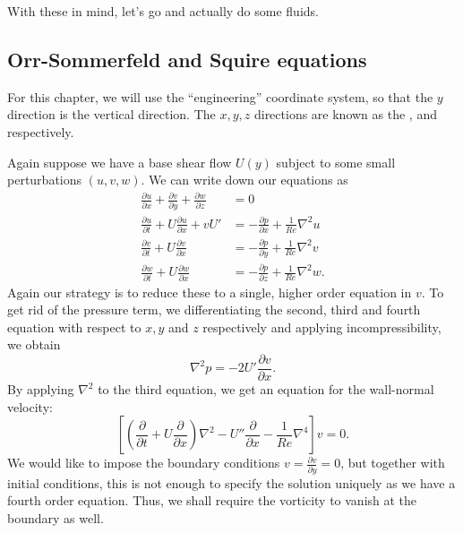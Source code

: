 \documentclass[a4paper]{article}
\begin{document}
With these in mind, let's go and actually do some fluids.

\subsection{Orr-Sommerfeld and Squire equations}
For this chapter, we will use the ``engineering'' coordinate system, so that the $y$ direction is the vertical direction. The $x, y, z$ directions are known as the ,  and  respectively.
\begin{center}
\end{center}
Again suppose we have a base shear flow $U(y)$ subject to some small perturbations $(u, v, w)$. We can write down our equations as
\begin{align*}
  \frac{\partial u}{\partial x} + \frac{\partial v}{\partial y} + \frac{\partial w}{\partial z} &= 0\\
  \frac{\partial u}{\partial t} + U \frac{\partial u}{\partial x} + v U' &= - \frac{\partial p}{\partial x} + \frac{1}{Re}\nabla^2 u\\
  \frac{\partial v}{\partial t} + U \frac{\partial v}{\partial x} &= - \frac{\partial p}{\partial y} + \frac{1}{Re} \nabla^2 v\\
  \frac{\partial w}{\partial t} + U \frac{\partial w}{\partial x} &= - \frac{\partial p}{\partial z} + \frac{1}{Re} \nabla^2 w.
\end{align*}
Again our strategy is to reduce these to a single, higher order equation in $v$. To get rid of the pressure term, we differentiating the second, third and fourth equation with respect to $x, y$ and $z$ respectively and applying incompressibility, we obtain
\[
  \nabla^2 p = -2U' \frac{\partial v}{\partial x}.
\]
By applying $\nabla^2$ to the third equation, we get an equation for the wall-normal velocity:
\[
  \left[ \left(\frac{\partial}{\partial t} + U \frac{\partial}{\partial x}\right)\nabla^2 - U'' \frac{\partial}{\partial x} - \frac{1}{Re}\nabla^4\right] v = 0.
\]
We would like to impose the boundary conditions $v = \frac{\partial v}{\partial y} = 0$, but together with initial conditions, this is not enough to specify the solution uniquely as we have a fourth order equation. Thus, we shall require the vorticity to vanish at the boundary as well.
\end{document}
